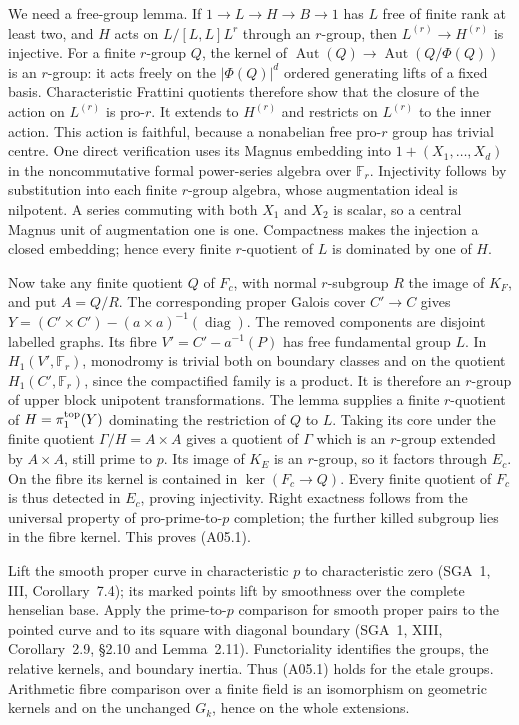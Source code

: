 We need a free-group lemma. If $1\to L\to H\to B\to1$ has $L$
free of finite rank at least two, and $H$ acts on
$L/[L,L]L^r$ through an $r$-group, then $L^{(r)}\to H^{(r)}$
is injective. For a finite $r$-group $Q$, the kernel of
$\operatorname{Aut}(Q)\to\operatorname{Aut}(Q/\Phi(Q))$ is an
$r$-group: it acts freely on the $|\Phi(Q)|^d$ ordered generating
lifts of a fixed basis. Characteristic Frattini quotients therefore
show that the closure of the action on $L^{(r)}$ is pro-$r$.
It extends to $H^{(r)}$ and restricts on $L^{(r)}$ to the inner
action. This action is faithful, because a nonabelian free pro-$r$
group has trivial centre. One direct verification uses its Magnus
embedding into $1+(X_1,\ldots,X_d)$ in the noncommutative formal
power-series algebra over $\mathbb F_r$. Injectivity follows by
substitution into each finite $r$-group algebra, whose augmentation
ideal is nilpotent. A series commuting with both $X_1$ and $X_2$
is scalar, so a central Magnus unit of augmentation one is one.
Compactness makes the injection a closed embedding; hence every
finite $r$-quotient of $L$ is dominated by one of $H$.

Now take any finite quotient $Q$ of $F_c$, with normal $r$-subgroup
$R$ the image of $K_F$, and put $A=Q/R$. The corresponding proper
Galois cover $C'\to C$ gives
$Y=(C'\times C')-(a\times a)^{-1}(\operatorname{diag})$.
The removed components are disjoint labelled graphs. Its fibre
$V'=C'-a^{-1}(P)$ has free fundamental group $L$. In
$H_1(V',\mathbb F_r)$, monodromy is trivial both on boundary
classes and on the quotient $H_1(C',\mathbb F_r)$, since the
compactified family is a product. It is therefore an $r$-group of
upper block unipotent transformations. The lemma supplies a finite
$r$-quotient of $H=\pi_1^{\rm top}(Y)$ dominating the restriction
of $Q$ to $L$. Taking its core under the finite quotient
$\Gamma/H=A\times A$ gives a quotient of $\Gamma$ which is an
$r$-group extended by $A\times A$, still prime to $p$.
Its image of $K_E$ is an $r$-group, so it factors through $E_c$.
On the fibre its kernel is contained in $\ker(F_c\to Q)$.
Every finite quotient of $F_c$ is thus detected in $E_c$, proving
injectivity. Right exactness follows from the universal property of
pro-prime-to-$p$ completion; the further killed subgroup lies in
the fibre kernel. This proves (A05.1).

Lift the smooth proper curve in characteristic $p$ to characteristic
zero (SGA~1, III, Corollary~7.4); its marked points lift by smoothness
over the complete henselian base. Apply the
prime-to-$p$ comparison for smooth proper pairs to the pointed
curve and to its square with diagonal boundary (SGA~1, XIII,
Corollary~2.9, \S2.10 and Lemma~2.11). Functoriality identifies
the groups, the relative kernels, and boundary inertia. Thus
(A05.1) holds for the etale groups. Arithmetic fibre comparison
over a finite field is an isomorphism on geometric kernels and
on the unchanged $G_k$, hence on the whole extensions.

